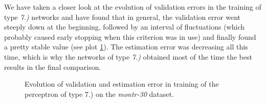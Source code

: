     \noindent We have taken a closer look at the evolution of validation errors in the training of type \textit{7.)} networks and have found that in general, the validation error went steeply down at the beginning, followed by an interval of fluctuations (which probably caused early stopping when this criterion was in use) and finally found a pretty stable value (see plot \ref{plot:neural-montrerr}). The estimation error was decreasing all this time, which is why the networks of type \textit{7.)} obtained most of the time the best results in the final comparison.
    
    \begin{figure}[h!]
		\begin{center}
		\end{center}
		\caption{\label{plot:neural-montrerr} Evolution of validation and estimation error in training of the perceptron of type 7.) on the \textit{montr-30} dataset.}
	\end{figure}
    
